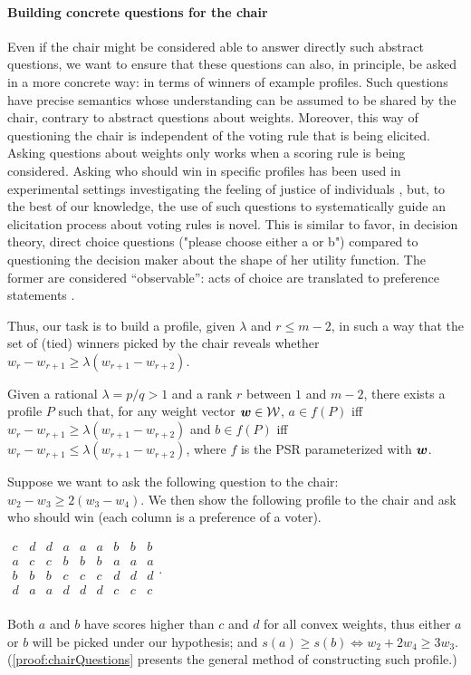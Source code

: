 \documentclass{article}
\begin{document}
\paragraph{Building concrete questions for the chair}
Even if the chair might be considered able to answer directly such abstract questions, we want to ensure that these questions can also, in principle, be asked in a more concrete way: in terms of winners of example profiles. Such questions have precise semantics whose understanding can be assumed to be shared by the chair, contrary to abstract questions about weights. 
Moreover, this way of questioning the chair is independent of the voting rule that is being elicited. Asking questions about weights only works when a scoring rule is being considered.
Asking who should win in specific profiles has been used in experimental settings investigating the feeling of justice of individuals \citep{Giritligil2005}, but, to the best of our knowledge, the use of such questions to systematically guide an elicitation process about voting rules is novel. 
This is similar to favor, in decision theory, direct choice questions ("please choose either a or b") compared to questioning the decision maker about the shape of her utility function. The former are considered “observable”: acts of choice are translated to preference statements \citep{colell_microeconomic_1995}. 

Thus, our task is to build a profile, given $\lambda$ and $r ≤ m-2$, in such a way that the set of (tied) winners picked by the chair reveals whether $w_{r} - w_{r+1} \geq \lambda (w_{r+1} - w_{r+2})$.
\begin{proposition}\label{prop:chairQuestions}
	Given a rational $\lambda = p/q > 1$ and a rank $r$ between $1$ and $m - 2$, there exists a profile $P$ such that, for any weight vector $\bm{w} \in \mathcal{W}$, $a \in f(P)$ iff $w_{r} - w_{r+1} ≥ \lambda (w_{r+1} - w_{r+2})$ and $b \in f(P)$ iff $w_{r} - w_{r+1} ≤ \lambda (w_{r+1} - w_{r+2})$, where $f$ is the PSR parameterized with $\bm{w}$.
\end{proposition}

\begin{example*}
	Suppose we want to ask the following question to the chair: $w_{2} - w_{3} ≥ 2 (w_{3} - w_{4})$. 
	We then show the following profile to the chair and ask who should win (each column is a preference of a voter).
	\begin{center}
		$
		\begin{array}{ccccccccc}
			c&d&d&a&a&a&b&b&b\\
			a&c&c&b&b&b&a&a&a\\
			b&b&b&c&c&c&d&d&d\\
			d&a&a&d&d&d&c&c&c\\
		\end{array}.
		$
	\end{center}
	Both $a$ and $b$ have scores higher than $c$ and $d$ for all convex weights, thus either $a$ or $b$ will be picked under our hypothesis; and $s(a) ≥ s(b) ⇔ w_2 + 2 w_4 ≥ 3 w_3$.
	(\cref{proof:chairQuestions} presents the general method of constructing such profile.)
\end{example*}
\end{document}
